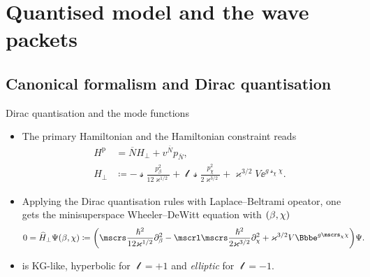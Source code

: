 \documentclass[9pt]{beamer}
\begin{document}
\section{Quantised model and the wave packets}

\subsection{Canonical formalism and Dirac quantisation}

\begin{frame}%
{Dirac quantisation and the mode functions}%
\begin{itemize}
\item
The primary Hamiltonian and the Hamiltonian
constraint reads
\begin{align}
H^\text{p} &= \overline{N}H_\perp + v^{\overline{N}} p_{\overline{N}},
\\
H_\perp &\coloneqq -\mscrs\frac{p_\beta^2}{12\varkappa^{1/2}}
+\mscrl\mscrs\frac{p_\chi^2}{2\varkappa^{3/2}}
+\varkappa^{3/2}V\ee^{g\mscrs_\chi\chi}.
\end{align}
\item
Applying the Dirac quantisation rules with Laplace--Beltrami
opeator, one 
gets the minisuperspace Wheeler--DeWitt equation with ${\left(\beta,\chi\right)}$
\begin{align}
0 &= \widehat{H}_\perp \rfun{\Psi}{\beta,\chi} \coloneqq
\rbr{\mscrs\frac{\hslash^2}{12\varkappa^{1/2}}\partial_{\beta}^2
-\mscrl\mscrs\frac{\hslash^2}{2\varkappa^{3/2}}\partial_{\chi}^2
+\varkappa^{3/2}V\ee^{g\mscrs_\chi\chi}}\Psi.
\label{eq:WDW-10}
\end{align}
\item
{} is KG-like, hyperbolic for $\mscrl = +1$ and 
\emph{elliptic} for $\mscrl = -1$.
\end{itemize}
\end{frame}
\end{document}
